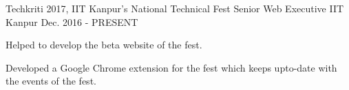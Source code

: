 

\begin{cventries}

  \cventry
    {Techkriti 2017, IIT Kanpur's National Technical Fest} %
    {Senior Web Executive} %
    {IIT Kanpur} %
    {Dec. 2016 - PRESENT} %
    {
      \begin{cvitems} %
      \item {Helped to develop the beta website of the fest.}
        \item {Developed a Google Chrome extension for the fest which keeps
            upto-date with the events of the fest.}
      \end{cvitems}
    }

\end{cventries}

